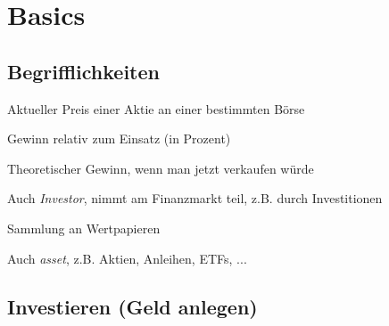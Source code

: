 \documentclass{beamer}
\begin{document}
	\begin{frame}
		\tableofcontents[hidesubsections]
	\end{frame}
	
	\section{Basics}
	
		\begin{frame}
		\end{frame}
	
		\subsection{Begrifflichkeiten}
		
		\begin{frame}
			\begin{description}[labelwidth=0cm]
				\item[Kurs] Aktueller Preis einer Aktie an einer bestimmten Börse\pause
				\item[Rendite] Gewinn relativ zum Einsatz (in Prozent)\pause
				\item[Buchgewinn] Theoretischer Gewinn, wenn man jetzt verkaufen würde\pause
				\item[Anleger] Auch \textit{Investor}, nimmt am Finanzmarkt teil, z.B. durch Investitionen\pause
				\item[Portfolio] Sammlung an Wertpapieren
				\item[Wertpapier] Auch \textit{asset}, z.B. Aktien, Anleihen, ETFs, ...
			\end{description}
		\end{frame}
		
		\subsection{Investieren (Geld anlegen)}
		
\end{document}
